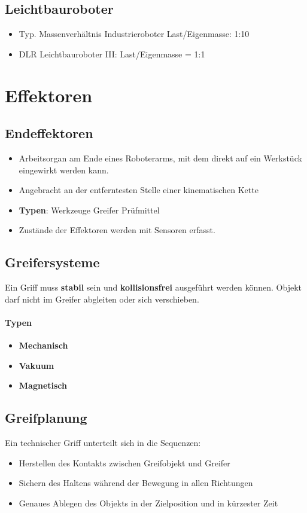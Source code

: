 \subsection{Leichtbauroboter}
\begin{itemize}
	\item Typ. Massenverhältnis Industrieroboter Last/Eigenmasse: 1:10
	\item DLR Leichtbauroboter III: Last/Eigenmasse = 1:1
\end{itemize}
\section{Effektoren}
\subsection{Endeffektoren}
\begin{itemize}
	\item Arbeitsorgan am Ende eines Roboterarms, mit dem direkt auf ein Werkstück eingewirkt werden kann.
	\item Angebracht an der entferntesten Stelle einer kinematischen Kette
	\item \textbf{Typen}:
	\subitem Werkzeuge
	\subitem Greifer
	\subitem Prüfmittel
	\item  Zustände der Effektoren werden mit Sensoren erfasst.
\end{itemize}
\subsection{Greifersysteme}
Ein Griff muss \textbf{stabil} sein und \textbf{kollisionsfrei} ausgeführt werden können.
Objekt darf nicht im Greifer abgleiten oder sich verschieben.
\paragraph{Typen}
\begin{itemize}
	\item \textbf{Mechanisch}
	\item \textbf{Vakuum}
	\item \textbf{Magnetisch}
\end{itemize}
\subsection{Greifplanung}
Ein technischer Griff unterteilt sich in die Sequenzen:
\begin{itemize}
	\item Herstellen des Kontakts zwischen Greifobjekt und Greifer
	\item Sichern des Haltens während der Bewegung in allen Richtungen
	\item Genaues Ablegen des Objekts in der Zielposition und in kürzester Zeit
\end{itemize}
